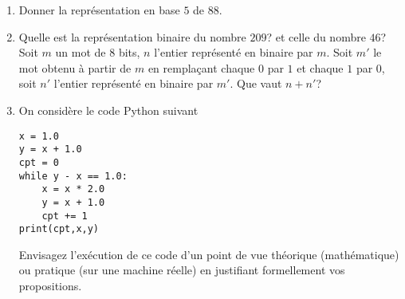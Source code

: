 \begin{enumerate}
  \item Donner la représentation en base $5$ de $88$.
  \item Quelle est la représentation binaire du nombre $209$? et celle du  nombre $46$?\newline
Soit $m$ un mot de $8$ bits, $n$ l'entier représenté en binaire par $m$. Soit $m'$ le mot obtenu à partir de $m$ en remplaçant chaque $0$ par $1$ et chaque $1$ par $0$, soit $n'$ l'entier représenté en binaire par $m'$. Que vaut $n+n'$?
\item On considère le code Python suivant
\begin{verbatim}
x = 1.0
y = x + 1.0
cpt = 0
while y - x == 1.0:
    x = x * 2.0
    y = x + 1.0
    cpt += 1
print(cpt,x,y)
\end{verbatim}
Envisagez l'exécution de ce code d'un point de vue théorique (mathématique) ou pratique (sur une machine réelle) en justifiant formellement vos propositions.
\end{enumerate}

